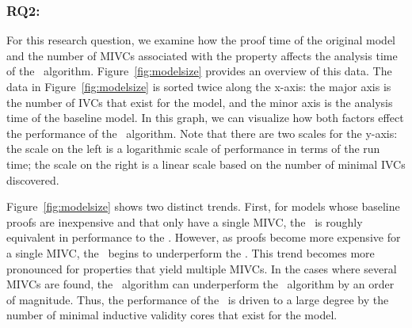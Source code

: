 \vspace{0.1in}
\subsubsection{RQ2:} For this research question, we examine how the proof time of the original model and the number of MIVCs associated with the property affects the analysis time of the \aivcalg\ algorithm.  Figure~\ref{fig:modelsize} provides an overview of this data.  The data in Figure~\ref{fig:modelsize} is sorted twice along the x-axis: the major axis is the number of IVCs that exist for the model, and the minor axis is the analysis time of the baseline model.  In this graph, we can visualize how both factors effect the performance of the \aivcalg\ algorithm.  Note that there are two scales for the y-axis: the scale on the left is a logarithmic scale of performance in terms of the run time; the scale on the right is a linear scale based on the number of minimal IVCs discovered.

Figure~\ref{fig:modelsize} shows two distinct trends.  First, for models whose baseline proofs are inexpensive and that only have a single MIVC, the \aivcalg\ is roughly equivalent in performance to the \ucbfalg.  However, as proofs become more expensive for a single MIVC, the \aivcalg\ begins to underperform the \ucbfalg.  This trend becomes more pronounced for properties that yield multiple MIVCs.  In the cases where several MIVCs are found, the \aivcalg\ algorithm can underperform the \ucbfalg\ algorithm by an order of magnitude.  Thus, the performance of the \aivcalg\ is driven to a large degree by the number of minimal inductive validity cores that exist for the model.



